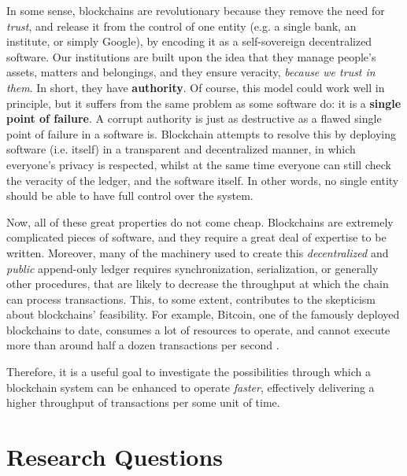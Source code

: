 In some sense, blockchains are revolutionary because they remove the need for \textit{trust}, and
release it from the control of one entity (e.g. a single bank, an institute, or simply Google), by
encoding it as a self-sovereign decentralized software. Our institutions are built upon the idea
that they manage people's assets, matters and belongings, and they ensure veracity, \textit{because
we trust in them}. In short, they have \textbf{authority}. Of course, this model could work well in
principle, but it suffers from the same problem as some software do: it is a \textbf{single point of
failure}. A corrupt authority is just as destructive as a flawed single point of failure in a
software is. Blockchain attempts to resolve this by deploying software (i.e. itself) in a
transparent and decentralized manner, in which everyone's privacy is respected, whilst at the same
time everyone can still check the veracity of the ledger, and the software itself. In other words,
no single entity should be able to have full control over the system.

Now, all of these great properties do not come cheap. Blockchains are extremely complicated pieces
of software, and they require a great deal of expertise to be written. Moreover, many of the
machinery used to create this \textit{decentralized} and \textit{public} append-only ledger requires
synchronization, serialization, or generally other procedures, that are likely to decrease the
throughput at which the chain can process transactions. This, to some extent, contributes to the
skepticism about blockchains' feasibility. For example, Bitcoin, one of the famously deployed
blockchains to date, consumes a lot of resources to operate, and cannot execute more than around
half a dozen transactions per second \cite{gervaisSecurityPerformanceProof2016}.

Therefore, it is a useful goal to investigate the possibilities through which a blockchain system
can be enhanced to operate \textit{faster}, effectively delivering a higher throughput of
transactions per some unit of time.

\section{Research Questions} \label{chap_intro:sec:resarch_q}

